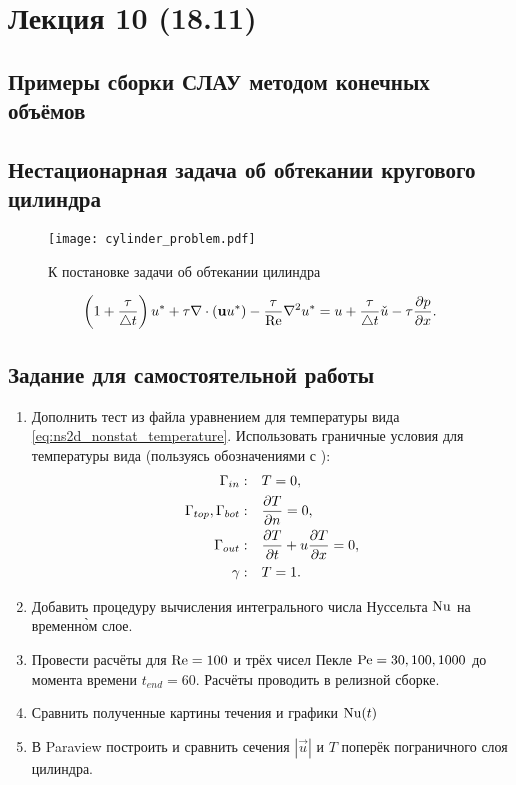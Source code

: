 \section{Лекция 10 (18.11)}
\subsection{Примеры сборки СЛАУ методом конечных объёмов}
\subsection{Нестационарная задача об обтекании кругового цилиндра}
\begin{figure}[h!]
\centering
\texttt{[image: cylinder\_problem.pdf]}
\caption{К постановке задачи об обтекании цилиндра}
\label{fig:cylinder-problem}

\end{figure}
\begin{equation}
\label{eq:ustar_fvm}
\left(1 + \frac{\tau}{\triangle t}\right) u^* + \tau \nabla\cdot(\boldsymbol{\rm u} u^*) - \frac{\tau}{\mathrm{Re}}\nabla^2 u^* = u + \frac{\tau}{\triangle t} \check u - \tau \frac{\partial p}{\partial x}.
\end{equation}


\subsection{Задание для самостоятельной работы}
\begin{enumerate}
\item
Дополнить тест  из файла 
уравнением для температуры вида \cref{eq:ns2d_nonstat_temperature}.
Использовать граничные условия для температуры вида (пользуясь обозначениями с ):
\begin{equation*}
\begin{aligned}
\Gamma_{in}:                &\quad T = 0,\\
\Gamma_{top}, \Gamma_{bot}: &\quad \frac{\partial T}{\partial n} = 0, \\
\Gamma_{out}:               &\quad \frac{\partial T}{\partial t} + u\frac{\partial T}{\partial x} = 0,\\
\gamma:                     &\quad T = 1. \\
\end{aligned}
\end{equation*}
\item
Добавить процедуру вычисления интегрального числа Нуссельта $\mathrm{Nu}$ на временн\`{о}м слое.
\item
Провести расчёты для $\mathrm{Re}=100$ и трёх чисел Пекле $\mathrm{Pe} = 30, 100, 1000$ до момента времени $t_{end} = 60$. Расчёты
проводить в релизной сборке.
\item
Сравнить полученные картины течения и графики $\mathrm{Nu}(t)$
\item
В Paraview построить и сравнить сечения $|\vec u|$ и $T$ поперёк пограничного слоя цилиндра.
\end{enumerate}

